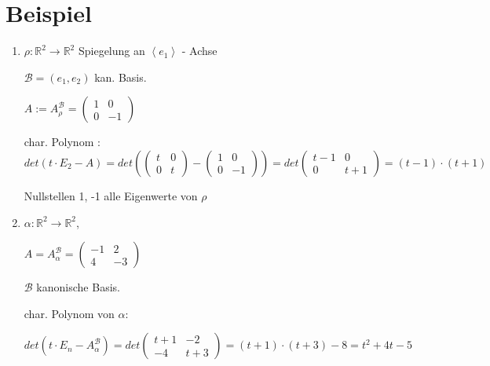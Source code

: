 \documentclass[a4paper, openany]{book}
\begin{document}
        \section{Beispiel}

        \begin{enumerate}[label=(\alph*)]
          \item $\rho : \mathbb{R}^2 \rightarrow \mathbb{R}^2$ Spiegelung an $\left \langle e_1 \right \rangle$ - Achse

          $\mathcal{B} = (e_1, e_2)$ kan. Basis.

          \par \medskip

          $A := A_{\rho}^{\mathcal{B}} = \begin{pmatrix}1 & 0 \\ 0 & -1 \end{pmatrix}$

          char. Polynom : $det(t \cdot E_2 - A) = det(\begin{pmatrix}t & 0 \\ 0 & t \end{pmatrix} - \begin{pmatrix}1 & 0 \\ 0 & -1 \end{pmatrix}) = det \begin{pmatrix}t-1  & 0 \\ 0 & t+1 \end{pmatrix} = (t-1) \cdot (t+1)$

          \par \medskip

          Nullstellen 1, -1 alle Eigenwerte von $\rho$

          \item $\alpha : \mathbb{R}^2 \rightarrow \mathbb{R}^2$, 

          $A = A_{\alpha}^{\mathcal{B}} = \begin{pmatrix}-1 & 2 \\ 4 & -3 \end{pmatrix}$

          $\mathcal{B}$ kanonische Basis.

          char. Polynom von $\alpha$:

          \begin{center}
            $det(t \cdot E_n - A_{\alpha}^{\mathcal{B}}) = det \begin{pmatrix}t+1 & -2 \\ -4 & t+3 \end{pmatrix} = (t+1) \cdot (t+3) - 8 = t^2 + 4t -5$
          \end{center}


\end{enumerate}
\end{document}
